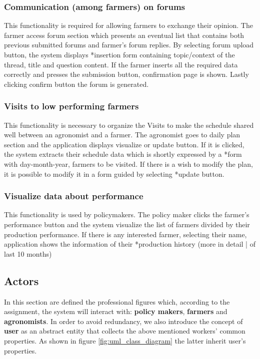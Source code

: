 \subsubsection{Communication (among farmers) on forums}
This functionality is required for allowing farmers to exchange their opinion. The farmer 
access forum section which presents an eventual list that contains both previous submitted 
forums and farmer’s forum replies. By selecting forum upload button, the system displays 
*insertion form containing topic/context of the thread, title and question content. If the farmer 
inserts all the required data correctly and presses the submission button, confirmation page 
is shown. Lastly clicking confirm button the forum is generated.   
\subsubsection{Visits to low performing farmers}
This functionality is necessary to organize the Visits to make the schedule shared well 
between an agronomist and a farmer. The agronomist goes to daily plan section and the 
application displays visualize or update button. If it is clicked, the system extracts their schedule
data which is shortly expressed by a *form with day-month-year, farmers to be visited.
If there is a wish to modify the plan, it is possible to modify it in a form guided by selecting 
*update button.
\subsubsection{Visualize data about performance}
This functionality is used by policymakers. The policy maker clicks the farmer's performance 
button and the system visualize the list of farmers divided by their production performance. If 
there is any interested farmer, selecting their name, application shows the information of their
*production history (more in detail | of last 10 months) 

\subsection{Actors}
\label{sec:actors}
In this section are defined the professional figures which, according to the assignment, the system will interact with: \textbf{policy makers}, \textbf{farmers} and \textbf{agronomists}. In order to avoid redundancy, we also introduce the concept of \textbf{user} as an abstract entity that collects the above mentioned workers' common properties. As shown in figure \ref{fig:uml_class_diagram} the latter inherit user's properties.
